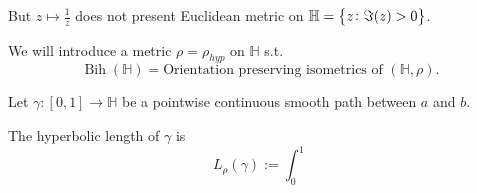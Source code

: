 \documentclass[11pt,a4paper]{article}
\DeclareMathOperator{\Bih}{Bih}
\renewcommand{\H}{\mathbb H}
\begin{document}
But $z \mapsto \frac 1z$ does not present Euclidean metric on 
$\H = \set{z \colon \Im(z) > 0}$.

We will introduce a metric $\rho = \rho_{hyp}$ on $\H$ s.t.\
\[
  \Bih(\H) = \text{Orientation preserving isometrics of } (\H,\rho).
\]

\begin{definition}[Length]
  Let $\gamma \colon [0,1] \to \H$ be a pointwise continuous smooth path
  between $a$ and $b$.

  The hyperbolic length of $\gamma$ is
  \[
    L_{\rho}(\gamma) :=
    \int_0^1 
  \]
\end{definition}
\end{document}
